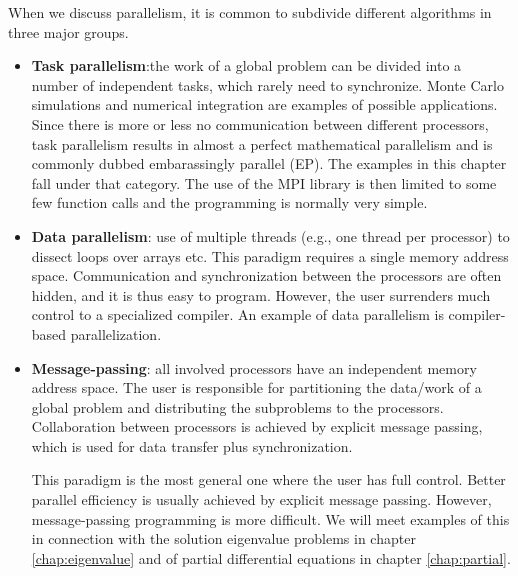 When we discuss parallelism, it is common to subdivide different algorithms in three major groups.
\begin{itemize}
\item {\bf Task parallelism}:the work of a global problem can be divided
into a number of independent tasks, which rarely need to synchronize. 
Monte Carlo simulations and numerical integration are examples of possible applications. 
Since there is more or less no communication between different processors, task parallelism results in almost 
a perfect mathematical parallelism and is commonly dubbed embarassingly parallel (EP).
The examples in this chapter fall under that category.  The use of the MPI library is then limited to some
few function calls and the programming is normally very simple.
\item {\bf Data parallelism}:  use of multiple threads (e.g., one thread per
processor) to dissect loops over arrays etc. 
This paradigm requires a single memory address space. 
Communication and synchronization between the processors are often hidden, and it is thus easy to
program. However, the user surrenders much control to a specialized compiler.
An example of data parallelism  is compiler-based parallelization.

\item {\bf Message-passing}: all involved processors have an independent
memory address space. The user is responsible for partitioning 
the data/work of a global problem and distributing the 
subproblems to the processors. Collaboration between processors
is achieved by explicit message passing, which is used for data
transfer plus synchronization.

This paradigm is the most general one where the user has full
control. Better parallel efficiency is usually achieved by explicit
message passing. However, message-passing programming is
more difficult.  We will meet examples of this in connection with the solution 
eigenvalue problems in chapter \ref{chap:eigenvalue} and 
of partial
differential equations in chapter \ref{chap:partial}. 

\end{itemize}

